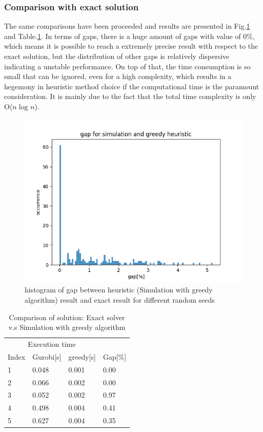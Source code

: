 \documentclass{article}
\begin{document}
\subsubsection{Comparison with exact solution}
The same comparisons have been proceeded and results are presented in Fig.\ref{fig:hist_sg} and Table.\ref{tab:exact_greedy}. In terms of gaps, there is a huge amount of gaps with value of 0\%, which means it is possible to reach a extremely precise result with respect to the exact solution, but the distribution of other gaps is relatively dispersive indicating a unstable performance. On top of that, the time consumption is so small that can be ignored, even for a high complexity, which results in a hegemony in heuristic method choice if the computational time is the paramount consideration. It is mainly due to the fact that the total time complexity is only O($n\log_{}n$).

\begin{figure}[ht]
    \centering
    \includegraphics[scale=0.7]{hist_sg.png}
    \caption{histogram of gap between heuristic (Simulation with greedy algorithm) result and exact result for different random seeds}
    \label{fig:hist_sg}
\end{figure}

\begin{table}[ht]
 \caption{Comparison of solution: Exact solver v.s Simulation with greedy algorithm}
  \centering
  \begin{tabular}{llll}
    \toprule
    \multicolumn{3}{c}{Execution time}                   \\
    \cmidrule(r){2-3}
    Index   & Gurobi[s]     & greedy[s]      & Gap[\%] \\
    \midrule
    1	&	0.048 	&	0.001 	&	0.00 	\\
    2	&	0.066 	&	0.002 	&	0.00 	\\
    3	&	0.052 	&	0.002 	&	0.97 	\\
    4	&	0.498 	&	0.004 	&	0.41 	\\
    5	&	0.627 	&	0.004 	&	0.35 	\\
    \bottomrule
  \end{tabular}
  \label{tab:exact_greedy}
\end{table}
\end{document}
